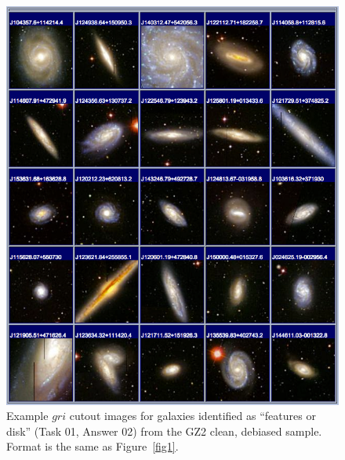\documentclass[useAMS,usenatbib]{mn2e}
\begin{document}
\newpage
\clearpage
\begin{figure}
\includegraphics[angle=0,width=7.0in]{figures/gallery/features.png}
\caption{Example $gri$ cutout images for galaxies identified as ``features or disk'' (Task 01, Answer 02) from the GZ2 clean, debiased sample. Format is the same as Figure~\ref{fig1}.}
\end{figure}
\end{document}
